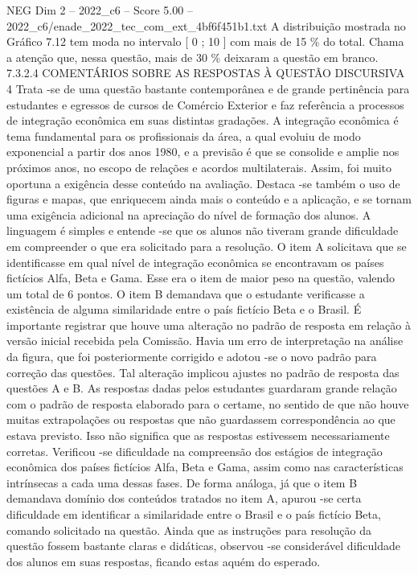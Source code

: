 \begin{textsample}{NEG Dim 2 – 2022\_c6 – Score 5.00 – 2022\_c6/enade\_2022\_tec\_com\_ext\_4bf6f451b1.txt}
A distribuição mostrada no Gráfico 7.12 tem moda no intervalo [ 0 ; 10 ] com mais de 15 \% do total.
Chama a atenção que, nessa questão, mais de 30 \% deixaram a questão em branco. 7.3.2.4 COMENTÁRIOS SOBRE AS RESPOSTAS À QUESTÃO DISCURSIVA 4 Trata -se de uma questão bastante contemporânea e de grande pertinência para estudantes e egressos de cursos de Comércio Exterior e faz referência a processos de integração econômica em suas distintas gradações.
A integração econômica é tema fundamental para os profissionais da área, a qual evoluiu de modo exponencial a partir dos anos 1980, e a previsão é que se consolide e amplie nos próximos anos, no escopo de relações e acordos multilaterais.
Assim, foi muito oportuna a exigência desse conteúdo na avaliação.
Destaca -se também o uso de figuras e mapas, que enriquecem ainda mais o conteúdo e a aplicação, e se tornam uma exigência adicional na apreciação do nível de formação dos alunos.
A linguagem é simples e entende -se que os alunos não tiveram grande dificuldade em compreender o que era solicitado para a resolução.
O item A solicitava que se identificasse em qual nível de integração econômica se encontravam os países fictícios Alfa, Beta e Gama.
Esse era o item de maior peso na questão, valendo um total de 6 pontos.
O item B demandava que o estudante verificasse a existência de alguma similaridade entre o país fictício Beta e o Brasil.
É importante registrar que houve uma alteração no padrão de resposta em relação à versão inicial recebida pela Comissão.
Havia um erro de interpretação na análise da figura, que foi posteriormente corrigido e adotou -se o novo padrão para correção das questões.
Tal alteração implicou ajustes no padrão de resposta das questões A e B.
As respostas dadas pelos estudantes guardaram grande relação com o padrão de resposta elaborado para o certame, no sentido de que não houve muitas extrapolações ou respostas que não guardassem correspondência ao que estava previsto.
Isso não significa que as respostas estivessem necessariamente corretas.
Verificou -se dificuldade na compreensão dos estágios de integração econômica dos países fictícios Alfa, Beta e Gama, assim como nas características intrínsecas a cada uma dessas fases.
De forma análoga, já que o item B demandava domínio dos conteúdos tratados no item A, apurou -se certa dificuldade em identificar a similaridade entre o Brasil e o país fictício Beta, comando solicitado na questão.
Ainda que as instruções para resolução da questão fossem bastante claras e didáticas, observou -se considerável dificuldade dos alunos em suas respostas, ficando estas aquém do esperado.

\end{textsample}
